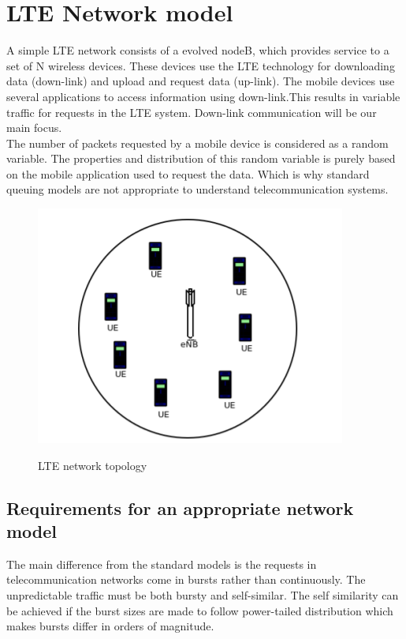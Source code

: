 \section{LTE Network model}
A simple LTE network consists of a evolved nodeB, which provides service to a set of N wireless devices. 
These devices use the LTE technology for downloading data (down-link) and  upload and request data (up-link).
The mobile devices use several applications to access information using down-link.This results in variable traffic for requests in the LTE system.
Down-link communication will be our main focus.
\\The number of packets requested by a mobile device is considered as a random variable.
The properties and distribution of this random variable is purely based on the mobile application used to request the data.
Which is why standard queuing models are not appropriate to understand telecommunication systems.\\
\begin{figure}[ht!]
        \centering
        \includegraphics[scale=1]{network.png}
        \\\caption{LTE network topology}
        \label{topology}
\end{figure}

\subsection{Requirements for an appropriate network model}
The main difference from the standard models is the requests in telecommunication networks come in bursts rather than continuously.
The unpredictable traffic must be both bursty and self-similar.
The self similarity can be achieved if the burst sizes are made to follow power-tailed distribution which makes bursts differ in orders of magnitude.

